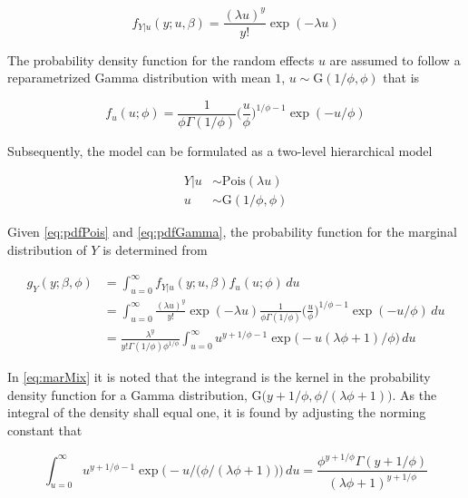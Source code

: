 \documentclass[preprint, 3p,
authoryear]{elsarticle} %
\begin{document}
\begin{equation}\label{eq:pdfPois}
  f_{Y|u}(y;u,\beta)=\frac{(\lambda u)^{y}}{y!}\exp(-\lambda u)
\end{equation}

The probability density function for the random effects \(u\) are
assumed to follow a reparametrized Gamma distribution with mean \(1\),
\(u \sim \mathrm{G}(1/\phi,\phi)\) that is

\begin{equation} \label{eq:pdfGamma}
  f_{u}(u;\phi)=\frac{1}{\phi \Gamma(1/\phi)} \bigg(\frac{u}{\phi}\bigg)^{1/\phi-1} \exp (-u/\phi)
\end{equation}

Subsequently, the model can be formulated as a two-level hierarchical
model

\begin{subequations} \label{eq:PoisGam}
  \begin{alignat}{2}
    {Y|u} &\sim \mathrm{Pois} (\lambda u) \label{eq:pois_g0} \\ 
    {u} &\sim \mathrm{G}( 1/\phi,\phi) \label{eq:pois_g1}
  \end{alignat}
\end{subequations}

Given \ref{eq:pdfPois} and \ref{eq:pdfGamma}, the probability function
for the marginal distribution of \(Y\) is determined from

\begin{equation} \label{eq:marMix}
  \begin{aligned}
    g_{Y}(y;\beta,\phi)&=\int_{u=0}^\infty f_{Y|u}(y;u,\beta) f_{u}(u;\phi) \,du \\
    &=\int_{u=0}^\infty \frac{(\lambda u)^y}{y!} \exp (-\lambda u) \frac{1}{\phi \Gamma(1/\phi)} \bigg(\frac{u}{\phi}\bigg)^{1/\phi-1} \exp (-u /\phi) \,du\\
    &=\frac{\lambda^{y}}{y!\Gamma(1/\phi)\phi^{1/\phi}} \int_{u=0}^\infty u^{y+1/\phi-1} \exp \big(-u(\lambda \phi+1)/\phi\big) \,du
  \end{aligned}
\end{equation}

In \ref{eq:marMix} it is noted that the integrand is the kernel in the
probability density function for a Gamma distribution,
\(\mathrm{G}\big(y+1/\phi,\phi/(\lambda \phi+1)\big)\). As the integral
of the density shall equal one, it is found by adjusting the norming
constant that

\begin{equation}
  \int_{u=0}^\infty  u^{ y+ 1/\phi-1} \exp \Big(- u/\big(\phi/( \lambda \phi+1)\big)\Big) \,du = \frac{\phi^{ y+ 1/\phi}\Gamma( y+ 1/\phi)}{( \lambda \phi + 1)^{y+1/\phi}}
\end{equation}
\end{document}
